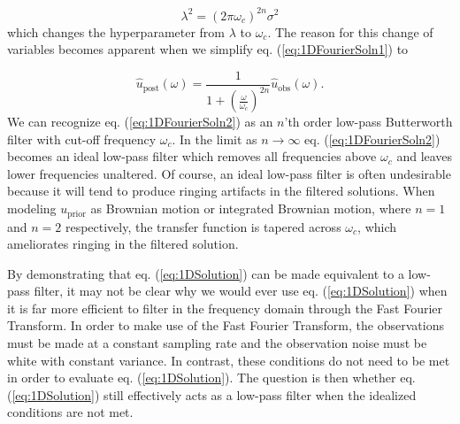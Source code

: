 \documentclass[10pt,a4paper]{article}
\begin{document}
\begin{equation}\label{eq:VariableChange}
\lambda^2 = (2\pi\omega_c)^{2n}\sigma^2
\end{equation}
which changes the hyperparameter from $\lambda$ to $\omega_c$.  The reason for this change of variables becomes apparent when we simplify eq. (\ref{eq:1DFourierSoln1}) to

\begin{equation}\label{eq:1DFourierSoln2}
\hat{u}_\mathrm{post}(\omega) = \frac{1}
                                  {1 + \left(\frac{\omega}{\omega_c}\right)^{2n}}
                                  \hat{u}_\mathrm{obs}(\omega).        
\end{equation}
We can recognize eq. (\ref{eq:1DFourierSoln2}) as an $n$'th order low-pass Butterworth filter with cut-off frequency $\omega_c$.  In the limit as $n\to \infty$ eq. (\ref{eq:1DFourierSoln2}) becomes an ideal low-pass filter which removes all frequencies above $\omega_c$ and leaves lower frequencies unaltered.  Of course, an ideal low-pass filter is often undesirable because it will tend to produce ringing artifacts in the filtered solutions.  When modeling $u_\mathrm{prior}$ as Brownian motion or integrated Brownian motion, where $n=1$ and $n=2$ respectively, the transfer function is tapered across $\omega_c$, which ameliorates ringing in the filtered solution.

By demonstrating that eq. (\ref{eq:1DSolution}) can be made equivalent to a low-pass filter, it may not be clear why we would ever use eq. (\ref{eq:1DSolution}) when it is far more efficient to filter in the frequency domain through the Fast Fourier Transform.  In order to make use of the Fast Fourier Transform, the observations must be made at a constant sampling rate and the observation noise must be  white with constant variance.  In contrast, these conditions do not need to be met in order to evaluate eq. (\ref{eq:1DSolution}).  The question is then whether eq. (\ref{eq:1DSolution}) still effectively acts as a low-pass filter when the idealized conditions are not met.  
\end{document}
